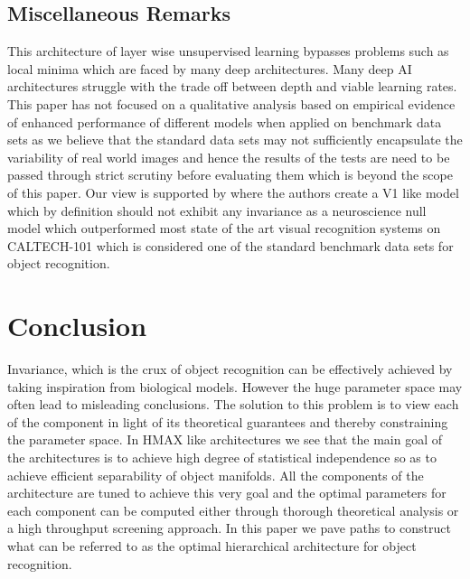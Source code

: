 \documentclass[12pt,twoside]{article}
\theoremstyle{plain}
\theoremstyle{definition}
\theoremstyle{remark}
\begin{document}
\subsection{Miscellaneous Remarks}
This architecture of layer wise unsupervised learning bypasses problems such as local minima which are faced by many deep architectures. Many deep AI architectures struggle with the trade off between depth and viable learning rates.
This paper has not focused on a qualitative analysis based on empirical evidence of enhanced performance of different models when applied on benchmark data sets as we believe that the standard data sets may not sufficiently encapsulate the variability of real world images and hence the results of the tests are need to be passed through strict scrutiny before evaluating them which is beyond the scope of this paper. Our view is supported by \cite{NicolasPinto2008} where the authors create a V1 like model which by definition should not exhibit any invariance as a neuroscience null model which outperformed most state of the art visual recognition systems on CALTECH-101 which is considered one of the standard benchmark data sets for object recognition. 

\section{Conclusion}
\label{sec:concl}
Invariance, which is the crux of object recognition can be effectively achieved by taking inspiration from biological models. However the huge parameter space may often lead to misleading conclusions. The solution to this problem is to view each of the component in light of its theoretical guarantees and thereby constraining the parameter space. In HMAX like architectures we see that the main goal of the architectures is to achieve high degree of statistical independence so as to achieve efficient separability of object manifolds. All the components of the architecture are tuned to achieve this very goal and the optimal parameters for each component can be computed either through thorough theoretical analysis or a high throughput screening approach. In this paper we pave paths to construct what can be referred to as the optimal hierarchical architecture for object recognition.



%
%
\newpage


\end{document}
